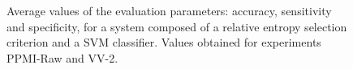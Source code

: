 	
	\begin{figure}
		\centering
		
		
		\caption{Average values of the evaluation parameters: accuracy, sensitivity and specificity, for a system composed of a relative entropy selection criterion and a SVM classifier. Values obtained for experiments PPMI-Raw and VV-2.} 
		\label{fig:meanParameters}
	\end{figure}
	
